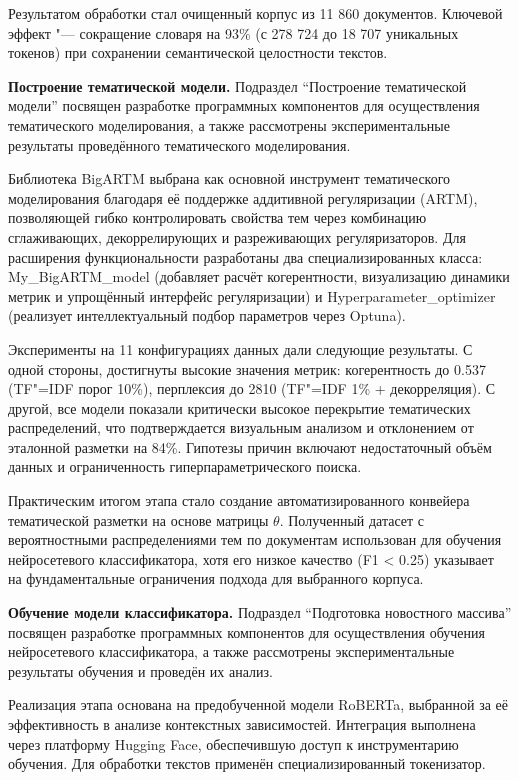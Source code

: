 \documentclass[autoref]{SCWorks}
\begin{document}
Результатом обработки стал очищенный корпус из 11 860 документов. Ключевой
эффект "--- сокращение словаря на 93\% (с 278 724 до 18 707 уникальных токенов)
при сохранении семантической целостности текстов.

\textbf{Построение тематической модели.}
Подраздел \enquote{Построение тематической модели} посвящен разработке
программных компонентов для осуществления тематического моделирования, а также
рассмотрены экспериментальные результаты проведённого тематического
моделирования. 

Библиотека BigARTM выбрана как основной инструмент тематического
моделирования благодаря её поддержке аддитивной регуляризации (ARTM),
позволяющей гибко контролировать свойства тем через комбинацию сглаживающих,
декоррелирующих и разреживающих регуляризаторов. Для расширения функциональности разработаны два
специализированных класса:\\My\_BigARTM\_model (добавляет расчёт когерентности,
визуализацию динамики метрик и упрощённый интерфейс регуляризации) и
Hyperparameter\_optimizer (реализует интеллектуальный подбор параметров через
Optuna).

Эксперименты на 11 конфигурациях данных дали следующие результаты. С
одной стороны, достигнуты высокие значения метрик: когерентность до 0.537
(TF"=IDF порог 10\%), перплексия до 2810 (TF"=IDF 1\% + декорреляция). С другой,
все модели показали критически высокое перекрытие тематических распределений,
что подтверждается визуальным анализом и отклонением от эталонной разметки на
84\%. Гипотезы причин включают недостаточный объём данных и ограниченность
гиперпараметрического поиска.

Практическим итогом этапа стало создание автоматизированного конвейера
тематической разметки на основе матрицы $\theta$. Полученный датасет с
вероятностными распределениями тем по документам использован для обучения
нейросетевого классификатора, хотя его низкое качество (F1 < 0.25) указывает на
фундаментальные ограничения подхода для выбранного корпуса.

\textbf{Обучение модели классификатора.}
Подраздел \enquote{Подготовка новостного массива} посвящен разработке
программных компонентов для осуществления обучения нейросетевого классификатора,
а также рассмотрены экспериментальные результаты обучения и проведён их анализ.

Реализация этапа основана на предобученной модели RoBERTa, выбранной за её
эффективность в анализе контекстных зависимостей. Интеграция выполнена через
платформу Hugging Face, обеспечившую доступ к инструментарию обучения. Для
обработки текстов применён специализированный токенизатор.
\end{document}
